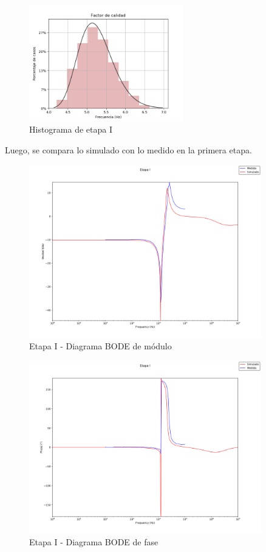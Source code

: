 \begin{figure}[H]
    \centering
    \includegraphics[width=0.6\textwidth]{../EJ3/Resources/histograma_stagei.png}
    \caption{Histograma de etapa I}
     \label{EJ3_STAGEI_HIST}
\end{figure}


Luego, se compara lo simulado con lo medido en la primera etapa.

\begin{figure}[H]
    \centering
    \includegraphics[width=0.9\textwidth]{../EJ3/Resources/stageI_ampbode.png}
    \caption{Etapa I - Diagrama BODE de m\'odulo}
     \label{EJ3_STAGEI_BODEAMP}
\end{figure}

\begin{figure}[H]
    \centering
    \includegraphics[width=0.9\textwidth]{../EJ3/Resources/stageI_phabode.png}
    \caption{Etapa I - Diagrama BODE de fase}
     \label{EJ3_STAGEI_BODEPHA}
\end{figure}

